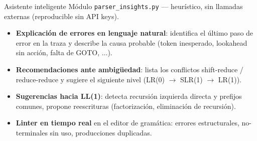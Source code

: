 \documentclass[aspectratio=169,10pt]{beamer}
\begin{document}
\begin{frame}{Asistente inteligente}
  Módulo \texttt{parser\_insights.py} — heurístico, sin llamadas externas
  (reproducible sin API keys).

  \begin{itemize}
    \item \textbf{Explicación de errores en lenguaje natural}: identifica
      el último paso de error en la traza y describe la causa probable
      (token inesperado, lookahead sin acción, falta de GOTO, $\ldots$).
    \item \textbf{Recomendaciones ante ambigüedad}: lista los conflictos
      shift-reduce / reduce-reduce y sugiere el siguiente nivel
      (LR(0) $\to$ SLR(1) $\to$ LR(1)).
    \item \textbf{Sugerencias hacia LL(1)}: detecta recursión izquierda
      directa y prefijos comunes, propone reescrituras
      (factorización, eliminación de recursión).
    \item \textbf{Linter en tiempo real} en el editor de gramática:
      errores estructurales, no-terminales sin uso, producciones duplicadas.
  \end{itemize}
\end{frame}
\end{document}
